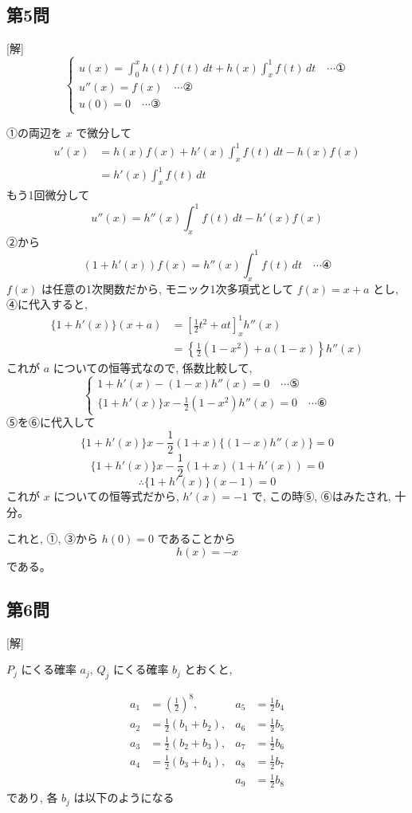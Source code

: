 \documentclass[../main.tex]{subfiles}
\begin{document}
\subsection*{第5問}

[解]
\[
  \begin{cases}
    u(x) = \int_0^x h(t) f(t) \, dt + h(x) \int_x^1 f(t) \, dt \quad \cdots \text{①} \\
    u''(x) = f(x) \quad \cdots \text{②} \\
    u(0) = 0 \quad \cdots \text{③}
  \end{cases}
\]

①の両辺を $x$ で微分して
\[
  \begin{aligned}
    u'(x) &= h(x)f(x) + h'(x) \int_x^1 f(t) \, dt - h(x)f(x) \\
    &= h'(x) \int_x^1 f(t) \, dt
  \end{aligned}
\]
もう1回微分して
\[
  u''(x) = h''(x) \int_x^1 f(t) \, dt - h'(x)f(x)
\]
②から
\[
  (1 + h'(x)) f(x) = h''(x) \int_x^1 f(t) \, dt \quad \cdots \text{④}
\]
$f(x)$ は任意の1次関数だから, モニック1次多項式として $f(x) = x+a$ とし, ④に代入すると,
\[
  \begin{aligned}
    \{1 + h'(x)\} (x+a) &= \left[ \frac{1}{2} t^2 + a t \right]_x^1 h''(x) \\
    &= \left\{ \frac{1}{2} (1-x^2) + a(1-x) \right\} h''(x)
  \end{aligned}
\]
これが $a$ についての恒等式なので, 係数比較して,
\[
  \begin{cases}
    1 + h'(x) - (1-x) h''(x) = 0 \quad \cdots \text{⑤} \\
    \{1 + h'(x)\} x - \frac{1}{2}(1-x^2) h''(x) = 0 \quad \cdots \text{⑥}
  \end{cases}
\]
⑤を⑥に代入して
\[
  \{1 + h'(x)\} x - \frac{1}{2}(1+x) \{ (1-x) h''(x) \} = 0
\]
\[
  \{1 + h'(x)\} x - \frac{1}{2}(1+x) (1 + h'(x)) = 0
\]
\[
  \therefore \{1 + h'(x)\} (x-1) = 0
\]
これが $x$ についての恒等式だから, $h'(x) = -1$ で, この時⑤, ⑥はみたされ, 十分。

これと, ①, ③から $h(0) = 0$ であることから
\[
  h(x) = -x
\]
である。

\subsection*{第6問}

[解]

$P_j$ にくる確率 $a_j$, $Q_j$ にくる確率 $b_j$ とおくと,

\[
  \begin{aligned}
    a_1 &= \left(\frac{1}{2}\right)^8, & a_5 &= \frac{1}{2} b_4 \\
    a_2 &= \frac{1}{2}(b_1 + b_2), & a_6 &= \frac{1}{2} b_5 \\
    a_3 &= \frac{1}{2}(b_2 + b_3), & a_7 &= \frac{1}{2} b_6 \\
    a_4 &= \frac{1}{2}(b_3 + b_4), & a_8 &= \frac{1}{2} b_7 \\
    & & a_9 &= \frac{1}{2} b_8
  \end{aligned}
\]
であり, 各 $b_j$ は以下のようになる
\end{document}
